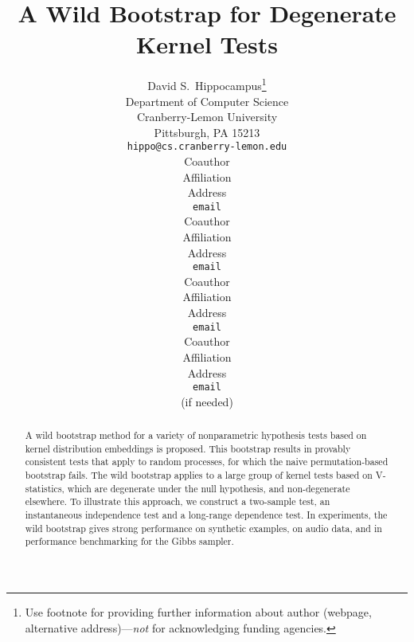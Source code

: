 \documentclass{article} %
\title{A Wild Bootstrap for Degenerate Kernel Tests}
\author{
David S.~Hippocampus\thanks{ Use footnote for providing further information
about author (webpage, alternative address)---\emph{not} for acknowledging
funding agencies.} \\
Department of Computer Science\\
Cranberry-Lemon University\\
Pittsburgh, PA 15213 \\
\texttt{hippo@cs.cranberry-lemon.edu} \\
\And
Coauthor \\
Affiliation \\
Address \\
\texttt{email} \\
\AND
Coauthor \\
Affiliation \\
Address \\
\texttt{email} \\
\And
Coauthor \\
Affiliation \\
Address \\
\texttt{email} \\
\And
Coauthor \\
Affiliation \\
Address \\
\texttt{email} \\
(if needed)\\
}
\begin{document}
\maketitle

\begin{abstract}

  A wild bootstrap method for a variety of nonparametric hypothesis
  tests based on kernel distribution embeddings is proposed. This
  bootstrap results in provably consistent tests that apply to random
  processes, for which the naive permutation-based bootstrap
  fails. The wild bootstrap applies to a large group of kernel tests
  based on V-statistics, which are degenerate under the null
  hypothesis, and non-degenerate elsewhere. To illustrate this
  approach, we construct a two-sample test, an instantaneous independence
  test and a long-range dependence test.  In experiments, the wild
  bootstrap gives strong performance on synthetic examples, on audio
  data, and in performance benchmarking for the Gibbs sampler.


\iffalse
A general-purpose nonparametric testing procedure is proposed
 in the case where the variables
being tested are time series, 
based on kernel distribution embeddings. The approach makes use of a wild
bootstrap procedure to obtain a test threshold, yielding
a test with the correct Type I error, and a Type II error approaching 
zero, as the number of samples increases.  The wild bootstrap 
 applies to all kernel tests based on V-statistics, which
are degenerate under the null hypothesis, and non-degenerate elsewhere 
(the present work treats both two-sample and independence testing).
Further, it is possible to test dependence between time series which might
occur  over a range of time lags, rather than at a given fixed lag.
In experiments, the wild bootstrap gives strong performance
on synthetic examples, on audio data, 
and in  performance benchmarking for the Gibbs sampler.
\fi

\end{abstract}


\end{document}
